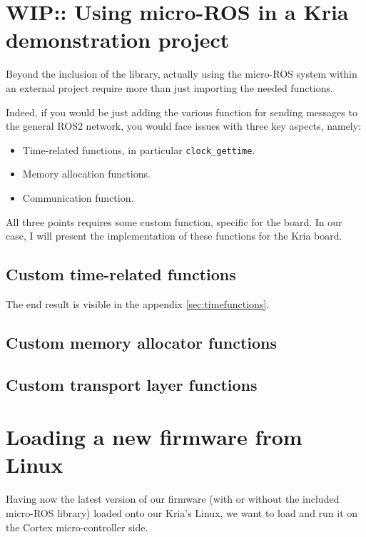 \documentclass[10pt]{article}
\begin{document}
\section{WIP:: Using micro-ROS in a Kria demonstration project}
\label{sec:kriademomicroros}
Beyond the inclusion of the library, actually using the micro-ROS system
within an external project require more than just importing the needed
functions.

Indeed, if you would be just adding the various function for sending messages to the
general ROS2 network, you would face issues with three key aspects, namely:
\begin{itemize}
\item Time-related functions, in particular \verb|clock_gettime|.
\item Memory allocation functions.
\item Communication function.
\end{itemize}

All three points requires some custom function, specific for the board.
In our case, I will present the implementation of these functions for the
Kria board.

\subsection{Custom time-related functions}
\label{sec:timefuncs}

The end result is visible in the appendix \ref{sec:timefunctions}.


\subsection{Custom memory allocator functions}
\label{sec:memallocators}

\subsection{Custom transport layer functions}
\label{sec:transportlayer}




\section{Loading a new firmware from Linux}
\label{sec:loading-new-firmware}
Having now the latest version of our firmware (with or without the included micro-ROS library) loaded onto our Kria's Linux, we want to load and run it
on the Cortex micro-controller side.
\end{document}
